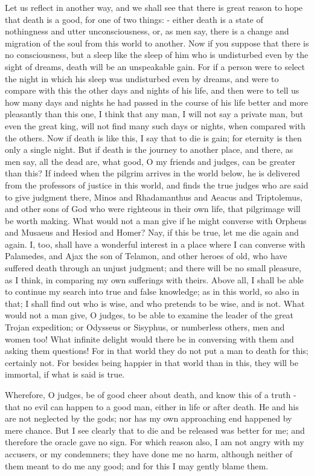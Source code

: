 Let us reflect in another way, and we shall see that there is great
reason to hope that death is a good, for one of two things: - either
death is a state of nothingness and utter unconsciousness, or, as
men say, there is a change and migration of the soul from this world
to another. Now if you suppose that there is no consciousness, but
a sleep like the sleep of him who is undisturbed even by the sight
of dreams, death will be an unspeakable gain. For if a person were
to select the night in which his sleep was undisturbed even by dreams,
and were to compare with this the other days and nights of his life,
and then were to tell us how many days and nights he had passed in
the course of his life better and more pleasantly than this one, I
think that any man, I will not say a private man, but even the great
king, will not find many such days or nights, when compared with the
others. Now if death is like this, I say that to die is gain; for
eternity is then only a single night. But if death is the journey
to another place, and there, as men say, all the dead are, what good,
O my friends and judges, can be greater than this? If indeed when
the pilgrim arrives in the world below, he is delivered from the professors
of justice in this world, and finds the true judges who are said to
give judgment there, Minos and Rhadamanthus and Aeacus and Triptolemus,
and other sons of God who were righteous in their own life, that pilgrimage
will be worth making. What would not a man give if he might converse
with Orpheus and Musaeus and Hesiod and Homer? Nay, if this be true,
let me die again and again. I, too, shall have a wonderful interest
in a place where I can converse with Palamedes, and Ajax the son of
Telamon, and other heroes of old, who have suffered death through
an unjust judgment; and there will be no small pleasure, as I think,
in comparing my own sufferings with theirs. Above all, I shall be
able to continue my search into true and false knowledge; as in this
world, so also in that; I shall find out who is wise, and who pretends
to be wise, and is not. What would not a man give, O judges, to be
able to examine the leader of the great Trojan expedition; or Odysseus
or Sisyphus, or numberless others, men and women too! What infinite
delight would there be in conversing with them and asking them questions!
For in that world they do not put a man to death for this; certainly
not. For besides being happier in that world than in this, they will
be immortal, if what is said is true. 

Wherefore, O judges, be of good cheer about death, and know this of
a truth - that no evil can happen to a good man, either in life or
after death. He and his are not neglected by the gods; nor has my
own approaching end happened by mere chance. But I see clearly that
to die and be released was better for me; and therefore the oracle
gave no sign. For which reason also, I am not angry with my accusers,
or my condemners; they have done me no harm, although neither of them
meant to do me any good; and for this I may gently blame them.

